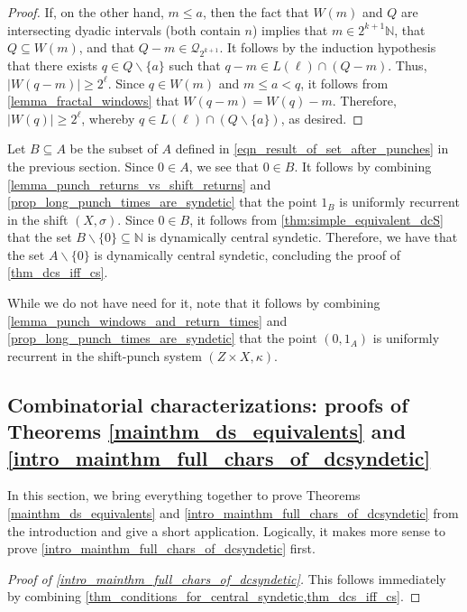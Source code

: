 \documentclass[letter,11pt]{article}
\theoremstyle{plain}
\theoremstyle{definition}
\theoremstyle{plain}
\theoremstyle{plain}
\numberwithin{equation}{section}
\newcommand{\N}{\mathbb{N}}
\renewcommand{\leq}{\leqslant}
\renewcommand{\geq}{\geqslant}
\renewcommand{\setminus}{\backslash}
\newcommand{\cubes}{\mathcal{Q}}
\newcommand{\odometer}{Z}
\begin{document}
\begin{proof}
    If, on the other hand, $m \leq a$, then the fact that $W(m)$ and $Q$ are intersecting dyadic intervals (both contain $n$) implies that $m \in 2^{k+1} \N$, that $Q \subseteq W(m)$, and that $Q - m \in \cubes_{2^{k+1}}$. It follows by the induction hypothesis that there exists $q \in Q \setminus \{a\}$ such that $q-m \in L(\ell) \cap (Q-m)$.  Thus, $|W(q-m)| \geq 2^\ell$. Since $q \in W(m)$ and $m \leq a < q$, it follows from \cref{lemma_fractal_windows} that $W(q-m) = W(q) - m$.  Therefore, $|W(q)| \geq 2^\ell$, whereby $q \in L(\ell) \cap (Q \setminus \{a\})$, as desired.
\end{proof}



Let $B \subseteq A$ be the subset of $A$ defined in \eqref{eqn_result_of_set_after_punches} in the previous section.  Since $0 \in A$, we see that $0 \in B$. It follows by combining \cref{lemma_punch_returns_vs_shift_returns} and \cref{prop_long_punch_times_are_syndetic} that the point $1_B$ is uniformly recurrent in the shift $(X,\sigma)$.  Since $0 \in B$, it follows from \cref{thm:simple_equivalent_dcS} that the set $B \setminus \{0\} \subseteq \N$ is dynamically central syndetic.  Therefore, we have that the set $A \setminus \{0\}$ is dynamically central syndetic, concluding the proof of \cref{thm_dcs_iff_cs}.

While we do not have need for it, note that it follows by combining \cref{lemma_punch_windows_and_return_times} and \cref{prop_long_punch_times_are_syndetic} that the point $(0,1_A)$ is uniformly recurrent in the shift-punch system $(\odometer \times X, \kappa)$.



\subsection{Combinatorial characterizations: proofs of Theorems \ref{mainthm_ds_equivalents} and \ref{intro_mainthm_full_chars_of_dcsyndetic}}
\label{sec_char_of_ds_and_dcs}

In this section, we bring everything together to prove Theorems \ref{mainthm_ds_equivalents} and \ref{intro_mainthm_full_chars_of_dcsyndetic} from the introduction and give a short application.  Logically, it makes more sense to prove \cref{intro_mainthm_full_chars_of_dcsyndetic} first.

\begin{proof}[Proof of \cref{intro_mainthm_full_chars_of_dcsyndetic}]
    This follows immediately by combining \cref{thm_conditions_for_central_syndetic,thm_dcs_iff_cs}.
\end{proof}
\end{document}
